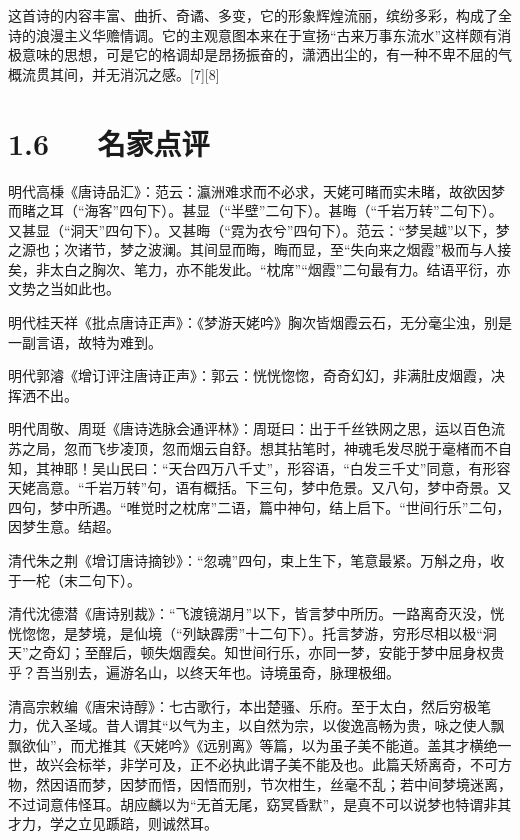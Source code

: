 \documentclass[letterpaper,12pt,english]{sphinxmanual}
\begin{document}
这首诗的内容丰富、曲折、奇谲、多变，它的形象辉煌流丽，缤纷多彩，构成了全诗的浪漫主义华赡情调。它的主观意图本来在于宣扬“古来万事东流水”这样颇有消极意味的思想，可是它的格调却是昂扬振奋的，潇洒出尘的，有一种不卑不屈的气概流贯其间，并无消沉之感。{[}7{]}{[}8{]}


\section{1.6   名家点评}
\label{\detokenize{p01_u6563_u6587/_u674e_u767d-_u68a6_u6e38_u5929_u59e5_u541f_u7559_u522b:id8}}
明代高棅《唐诗品汇》：范云：瀛洲难求而不必求，天姥可睹而实未睹，故欲因梦而睹之耳（“海客”四句下）。甚显（“半壁”二句下）。甚晦（“千岩万转”二句下）。又甚显（“洞天”四句下）。又甚晦（“霓为衣兮”四句下）。范云：“梦吴越”以下，梦之源也；次诸节，梦之波澜。其间显而晦，晦而显，至“失向来之烟霞”极而与人接矣，非太白之胸次、笔力，亦不能发此。“枕席”“烟霞”二句最有力。结语平衍，亦文势之当如此也。

明代桂天祥《批点唐诗正声》：《梦游天姥吟》胸次皆烟霞云石，无分毫尘浊，别是一副言语，故特为难到。

明代郭濬《增订评注唐诗正声》：郭云：恍恍惚惚，奇奇幻幻，非满肚皮烟霞，决挥洒不出。

明代周敬、周珽《唐诗选脉会通评林》：周珽曰：出于千丝铁网之思，运以百色流苏之局，忽而飞步凌顶，忽而烟云自舒。想其拈笔时，神魂毛发尽脱于毫楮而不自知，其神耶！吴山民曰：“天台四万八千丈”，形容语，“白发三千丈”同意，有形容天姥高意。“千岩万转”句，语有概括。下三句，梦中危景。又八句，梦中奇景。又四句，梦中所遇。“唯觉时之枕席”二语，篇中神句，结上启下。“世间行乐”二句，因梦生意。结超。

清代朱之荆《增订唐诗摘钞》：“忽魂”四句，束上生下，笔意最紧。万斛之舟，收于一柁（末二句下）。

清代沈德潜《唐诗别裁》：“飞渡镜湖月”以下，皆言梦中所历。一路离奇灭没，恍恍惚惚，是梦境，是仙境（“列缺霹雳”十二句下）。托言梦游，穷形尽相以极“洞天”之奇幻；至酲后，顿失烟霞矣。知世间行乐，亦同一梦，安能于梦中屈身权贵乎？吾当别去，遍游名山，以终天年也。诗境虽奇，脉理极细。

清高宗敕编《唐宋诗醇》：七古歌行，本出楚骚、乐府。至于太白，然后穷极笔力，优入圣域。昔人谓其“以气为主，以自然为宗，以俊逸高畅为贵，咏之使人飘飘欲仙”，而尤推其《天姥吟》《远别离》等篇，以为虽子美不能道。盖其才横绝一世，故兴会标举，非学可及，正不必执此谓子美不能及也。此篇夭矫离奇，不可方物，然因语而梦，因梦而悟，因悟而别，节次柑生，丝毫不乱；若中间梦境迷离，不过词意伟怪耳。胡应麟以为“无首无尾，窈冥昏默”，是真不可以说梦也特谓非其才力，学之立见踬踣，则诚然耳。
\end{document}
